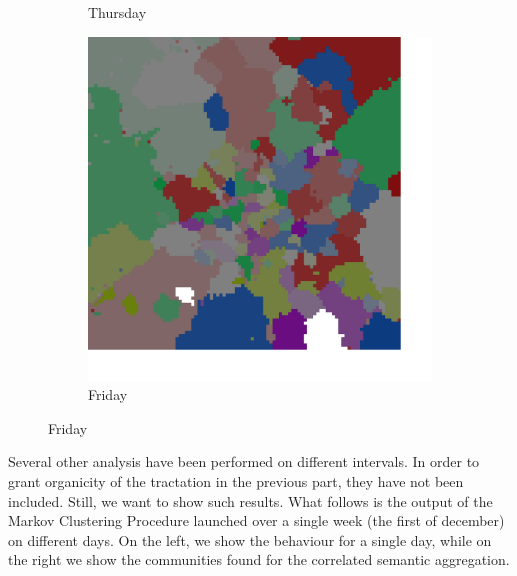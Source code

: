 \documentclass[12pt,a4paper]{article}
\begin{document}
\begin{figure}[H]
\begin{subfigure}[b]{0.30\textwidth}
\caption{Thursday}
\end{subfigure}
\begin{subfigure}[b]{0.30\textwidth}
\includegraphics[width=\textwidth]{week/5Fri.png}
\caption{Friday}
\end{subfigure}
\end{figure}

Several other analysis have been performed on different intervals. In order to grant organicity of the tractation in the previous part, they have not been included.
Still, we want to show such results.
What follows is the output of the Markov Clustering Procedure launched over a single week (the first of december) on different days. On the left, we show the behaviour for a single day, while on the right we show the communities found for the correlated semantic aggregation.
\end{document}

